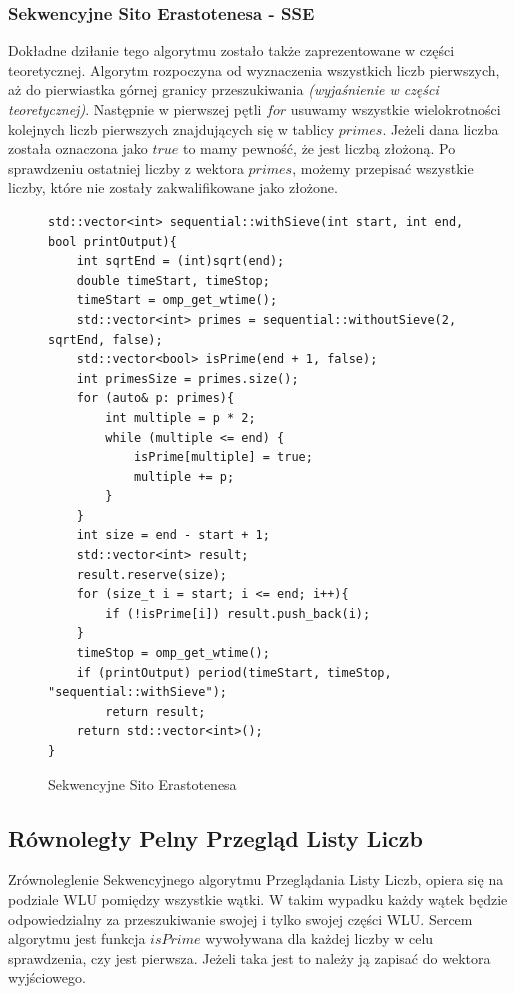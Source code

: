 \documentclass{article}
\begin{document}
            \subsubsection{Sekwencyjne Sito Erastotenesa - \gls{SSE}}
                Dokładne dziłanie tego algorytmu zostało także zaprezentowane w części teoretycznej. Algorytm rozpoczyna od wyznaczenia wszystkich liczb pierwszych, aż do pierwiastka górnej granicy przeszukiwania \emph{(wyjaśnienie w części teoretycznej)}. Następnie w pierwszej pętli $for$ usuwamy wszystkie wielokrotności kolejnych liczb pierwszych znajdujących się w tablicy $primes$. Jeżeli dana liczba została oznaczona jako $true$ to mamy pewność, że jest liczbą złożoną. Po sprawdzeniu ostatniej liczby z wektora $primes$, możemy przepisać wszystkie liczby, które nie zostały zakwalifikowane jako złożone.
                \begin{figure}
                    \begin{verbatim}
std::vector<int> sequential::withSieve(int start, int end, bool printOutput){
    int sqrtEnd = (int)sqrt(end);
    double timeStart, timeStop;
    timeStart = omp_get_wtime();
    std::vector<int> primes = sequential::withoutSieve(2, sqrtEnd, false);
    std::vector<bool> isPrime(end + 1, false);
    int primesSize = primes.size();
    for (auto& p: primes){
        int multiple = p * 2;
        while (multiple <= end) {
            isPrime[multiple] = true;
            multiple += p;
        }
    }
    int size = end - start + 1;
    std::vector<int> result;
    result.reserve(size);
    for (size_t i = start; i <= end; i++){
        if (!isPrime[i]) result.push_back(i);
    }
    timeStop = omp_get_wtime();
    if (printOutput) period(timeStart, timeStop, "sequential::withSieve");
        return result;
    return std::vector<int>();
}
                    \end{verbatim}
                    \caption{Sekwencyjne Sito Erastotenesa}
                \end{figure}
                
            \subsection{Równoległy Pelny Przegląd Listy Liczb}
                Zrównoleglenie Sekwencyjnego algorytmu Przeglądania Listy Liczb, opiera się na podziale \gls{WLU} pomiędzy wszystkie wątki. W takim wypadku każdy wątek będzie odpowiedzialny za przeszukiwanie swojej i tylko swojej części \gls{WLU}. Sercem algorytmu jest funkcja $isPrime$ wywoływana dla każdej liczby w celu sprawdzenia, czy jest pierwsza. Jeżeli taka jest to należy ją zapisać do wektora wyjściowego.
\end{document}

